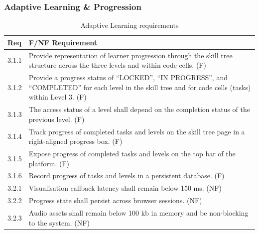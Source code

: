 \documentclass{article}
\begin{document}
\subsubsection{Adaptive Learning \& Progression}
\begin{table}[H]
\centering
\begin{tabular}{|p{1cm}|p{12.5cm}|}
\hline
\textbf{Req} & \textbf{F/NF Requirement} \\
\hline
3.1.1 & Provide representation of learner progression through the skill tree structure across the three levels and within code cells. (F) \\
\hline
3.1.2 & Provide a progress status of ``LOCKED'', ``IN PROGRESS'', and ``COMPLETED'' for each level in the skill tree and for code cells (tasks) within Level 3. (F) \\
\hline
3.1.3 & The access status of a level shall depend on the completion status of the previous level. (F) \\
\hline
3.1.4 & Track progress of completed tasks and levels on the skill tree page in a right-aligned progress box. (F) \\
\hline
3.1.5 & Expose progress of completed tasks and levels on the top bar of the platform. (F) \\
\hline
3.1.6 & Record progress of tasks and levels in a persistent database. (F) \\
\hline
3.2.1 & Visualisation callback latency shall remain below 150 ms. (NF) \\
\hline
3.2.2 & Progress state shall persist across browser sessions. (NF) \\
\hline
3.2.3 & Audio assets shall remain below 100 kb in memory and be non-blocking to the system. (NF) \\
\hline
\end{tabular}
\caption{Adaptive Learning requirements}
\end{table}
\end{document}
